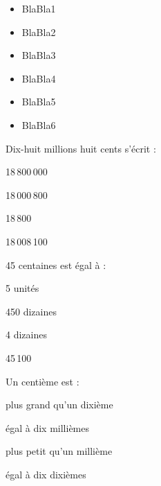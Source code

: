 \begin{acquis}
\begin{itemize}
\item BlaBla1
\item BlaBla2
\item BlaBla3
\item BlaBla4
\item BlaBla5
\item BlaBla6
\end{itemize}
\end{acquis}


\begin{QCM}
  \begin{GroupeQCM} %
    \begin{exercice}
      Dix-huit millions huit cents s'écrit :
      \begin{ChoixQCM}{4}
      \item 18\,800\,000
      \item 18\,000\,800
      \item 18\,800
      \item 18\,008\,100
      \end{ChoixQCM}
\begin{corrige}
   \end{corrige}
    \end{exercice}

    \begin{exercice}
      45 centaines est égal à :
      \begin{ChoixQCM}{4}
      \item 5 unités
      \item 450 dizaines
      \item 4 dizaines
      \item 45\,100
      \end{ChoixQCM}
      \begin{corrige}
   \end{corrige}
    \end{exercice}

    
    \begin{exercice}
      Un centième est :
      \begin{ChoixQCM}{4}
      \item plus grand qu'un dixième %
      \item égal à dix millièmes
      \item plus petit qu'un millième
      \item égal à dix  dixièmes
      \end{ChoixQCM}
      \begin{corrige}
   \end{corrige}
    \end{exercice}



\end{GroupeQCM}
\end{QCM}
